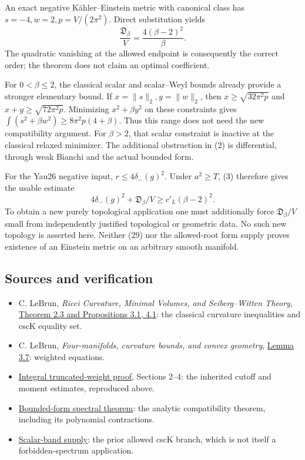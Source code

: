 \documentclass[
  10pt,
]{article}
\providecommand{\tightlist}{%
  \setlength{\itemsep}{0pt}\setlength{\parskip}{0pt}}
\begin{document}
An exact negative Kähler--Einstein metric with canonical class has
\(s=-4,w=2,p=V/(2\pi^2)\). Direct substitution yields \[
\frac{\mathfrak D_\beta}{V}
=\frac{4(\beta-2)^2}{\beta}.
\tag{28}
\] The quadratic vanishing at the allowed endpoint is consequently the
correct order; the theorem does not claim an optimal coefficient.

For \(0<\beta\le2\), the classical scalar and scalar--Weyl bounds
already provide a stronger elementary bound. If \(x=\|s\|_2,y=\|w\|_2\),
then \(x\ge\sqrt{32\pi^2p}\) and \(x+y\ge\sqrt{72\pi^2p}\). Minimizing
\(x^2+\beta y^2\) on these constraints gives
\(\int(s^2+\beta w^2) \ge8\pi^2p(4+\beta)\). Thus this range does not
need the new compatibility argument. For \(\beta>2\), that scalar
constraint is inactive at the classical relaxed minimizer. The
additional obstruction in (2) is differential, through weak Bianchi and
the actual bounded form.

For the Yau26 negative input, \(r\le4\delta_-(g)^2\). Under
\(a^2\ge T\), (3) therefore gives the usable estimate \[
4\delta_-(g)^2+\mathfrak D_\beta/V
\ge c'_L(\beta-2)^2.
\tag{29}
\] To obtain a new purely topological application one must additionally
force \(\mathfrak D_\beta/V\) small from independently justified
topological or geometric data. No such new topology is asserted here.
Neither (29) nor the allowed-root form supply proves existence of an
Einstein metric on an arbitrary smooth manifold.

\hypertarget{sources-and-verification}{%
\subsection{Sources and verification}\label{sources-and-verification}}

\begin{itemize}
\tightlist
\item
  C. LeBrun, \emph{Ricci Curvature, Minimal Volumes, and Seiberg--Witten
  Theory}, \href{https://arxiv.org/abs/math/0003068}{Theorem 2.3 and
  Propositions 3.1, 4.1}: the classical curvature inequalities and cscK
  equality set.
\item
  C. LeBrun, \emph{Four-manifolds, curvature bounds, and convex
  geometry}, \href{https://arxiv.org/abs/math/0611450}{Lemma 3.7}:
  weighted equations.
\item
  \href{round4_rigidity.md}{Integral truncated-weight proof}, Sections
  2--4: the inherited cutoff and moment estimates, reproduced above.
\item
  \href{round21_analytic.md}{Bounded-form spectral theorem}: the
  analytic compatibility theorem, including its polynomial contractions.
\item
  \href{line1_scalar_band_remainder.md}{Scalar-band supply}: the prior
  allowed cscK branch, which is not itself a forbidden-spectrum
  application.
\end{itemize}
\end{document}
